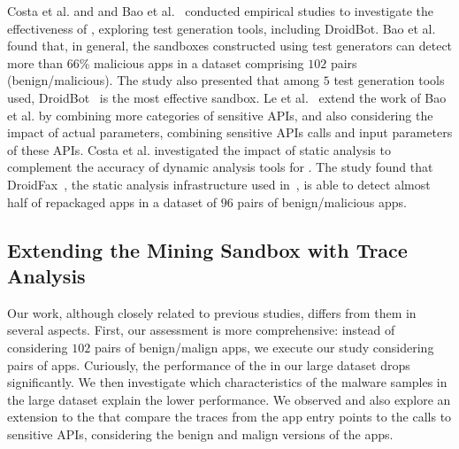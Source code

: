 Costa et al. and and Bao et al.~\cite{DBLP:conf/wcre/BaoLL18,DBLP:conf/scam/CostaMCMVBC20} conducted empirical studies to investigate the effectiveness of \mas, exploring test generation tools, including DroidBot. Bao et al. found that, in general, the sandboxes constructed using test generators can detect more than $66$\% malicious apps in a dataset comprising $102$ pairs (benign/malicious). The study also presented that among $5$ test generation tools used, DroidBot~\cite{DBLP:conf/icse/LiYGC17} is the most effective sandbox.
Le et al.~\cite{le2018towards} extend the work of Bao et al. by combining more categories of sensitive APIs, and also considering the impact of actual parameters, combining sensitive APIs calls and input parameters of these APIs.
Costa et al.\cite{DBLP:journals/jss/CostaMMSSBNR22} investigated the impact of static analysis to complement the accuracy of dynamic analysis tools for \mas. The study found that DroidFax~\cite{DBLP:conf/icsm/CaiR17a}, the static analysis infrastructure used in~\cite{DBLP:conf/wcre/BaoLL18}, is able to detect almost half of repackaged apps in a
dataset of $96$ pairs of benign/malicious apps.


\subsection{Extending the Mining Sandbox with Trace Analysis}

Our work, although closely related to previous studies, differs from them in several aspects.  First, our assessment is more comprehensive: instead of considering $102$ pairs of benign/malign apps, we execute our study considering \apps pairs of apps. Curiously, the performance of the \mas in our large dataset drops significantly. We then investigate which characteristics of the malware samples in the large dataset explain the lower performance. We observed and also explore an extension to the \mas that compare the traces from the app entry points to the calls to sensitive APIs, considering the benign and malign versions of the apps. 

